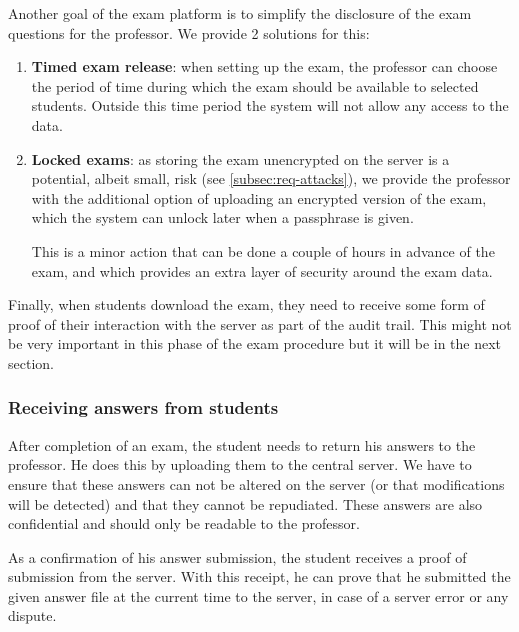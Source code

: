 \documentclass[12pt]{article}
\begin{document}
Another goal of the exam platform is to simplify the disclosure of the exam
questions for the professor. We provide 2 solutions for this:

\begin{enumerate}

\item \textbf{Timed exam release}: when setting up the exam, the professor can
choose the period of time during which the exam should be available to selected
students. Outside this time period the system will not allow any access to the
data.

\item \textbf{Locked exams}: as storing the exam unencrypted on the server is a
potential, albeit small, risk (see \autoref{subsec:req-attacks}), we provide the
professor with the additional option of uploading an encrypted version of the
exam, which the system can unlock later when a passphrase is given.

This is a minor action that can be done a couple of hours in advance of the
exam, and which provides an extra layer of security around the exam data.

\end{enumerate}

Finally, when students download the exam, they need to receive some form of
proof of their interaction with the server as part of the audit trail. This
might not be very important in this phase of the exam procedure but it will be
in the next section.

\subsubsection{Receiving answers from students}
\label{subsubsec:req-func-answers}


After completion of an exam, the student needs to return his answers to the
professor. He does this by uploading them to the central server. We have to
ensure that these answers can not be altered on the server (or that
modifications will be detected) and that they cannot be repudiated. These
answers are also confidential and should only be readable to the professor.

As a confirmation of his answer submission, the student receives a proof of
submission from the server. With this receipt, he can prove that he submitted
the given answer file at the current time to the server, in case of a server
error or any dispute.
\end{document}
